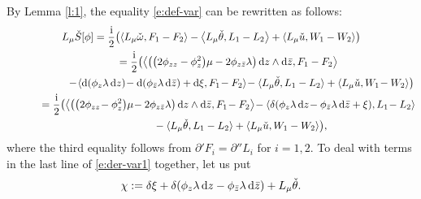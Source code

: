 \documentclass[pdftex]{sigma}%
\numberwithin{equation}{section}
\begin{document}
By Lemma \ref{l:1}, the equality \eqref{e:def-var} can be rewritten as follows:
\begin{gather}
L_{\mu}\check{S}[\phi]
 =\frac{\rm i}{2}\bigl(\langle L_{\mu}\check{\omega}, F_1-F_2 \rangle-\big\langle L_{\mu}\check{\theta}, L_1-L_2 \big\rangle+\langle L_{\mu}\check{u}, W_1-W_2 \rangle\bigr)\nonumber
 \\ \hphantom{L_{\mu}\check{S}[\phi]}
{}=\frac{\rm i}{2}\bigl(\big\langle \big(\big(2\phi_{zz}-\phi^2_z\big)\mu -2\phi_{z\bar{z}} \lambda \big)\, {\rm d}z\wedge {\rm d}\bar{z}, F_1-F_2 \big\rangle \nonumber
\\ \hphantom{L_{\mu}\check{S}[\phi]=\frac{\rm i}{2}\bigl(}
{} -\!\langle {\rm d}(\phi_z \lambda \,{\rm d}z)\! - {\rm d}(\phi_{\bar{z}} \lambda\, {\rm d}\bar{z})+ {\rm d}\xi, F_1\!-F_2 \rangle\! -\langle L_{\mu}\check{\theta}, L_1-L_2 \rangle +\langle L_{\mu}\check{u}, W_1\!-W_2 \rangle\bigr)\nonumber
\\ \hphantom{L_{\mu}\check{S}[\phi]}
{}=\frac{\rm i}{2}\bigl(\big\langle\big(\big(2\phi_{zz}\!-\phi^2_z\big)\mu \!-2\phi_{z\bar{z}} \lambda \big)\, {\rm d}z\wedge {\rm d}\bar{z}, F_1\!-F_2 \big\rangle \!-\langle \delta(\phi_z \lambda \,{\rm d}z\!- \phi_{\bar{z}} \lambda\, {\rm d}\bar{z} + \xi), L_1\!-L_2 \rangle\nonumber
\\ \hphantom{L_{\mu}\check{S}[\phi]=\frac{\rm i}{2}\bigl(}
{} -\langle L_{\mu}\check{\theta}, L_1-L_2 \rangle+\langle L_{\mu}\check{u}, W_1-W_2 \rangle\bigr),
\label{e:der-var1}
\end{gather}
where the third equality follows from $\partial' F_i=\partial'' L_i$ for $i=1,2$.
To deal with terms in the last line of \eqref{e:der-var1} together, let us put
\begin{gather}\label{e:def-chi}
{\chi}:= \delta\xi + \delta(\phi_z \lambda \,{\rm d}z - \phi_{\bar{z}} \lambda\, {\rm d}\bar{z}) + L_{\mu} \check{\theta}.
\end{gather}
\end{document}
